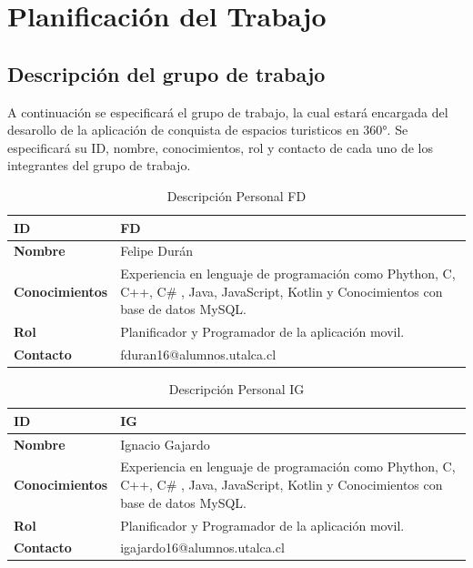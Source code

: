 \section{Planificación del Trabajo}

\subsection{Descripción del grupo de trabajo}
A continuación se especificará el grupo de trabajo, la cual estará encargada del desarollo de la aplicación de conquista de espacios turisticos en 360°. Se especificará su ID, nombre, conocimientos, rol y contacto de cada uno de los integrantes del grupo de trabajo.

\begin{table}[H]
    \centering
        \begin{tabular}{|l | p{12cm} |}        
        \hline
        \textbf{ID} & FD \\
        \hline
        \textbf{Nombre} & Felipe Durán \\
        \hline
        \textbf{Conocimientos} & Experiencia en lenguaje de programación como Phython, C, C++, C\# , Java, JavaScript, Kotlin y Conocimientos con base de datos MySQL. \\
        \hline
        \textbf{Rol} & Planificador y Programador de la aplicación movil. \\    
        \hline
        \textbf{Contacto} & fduran16@alumnos.utalca.cl \\
        \hline            
        \end{tabular}
    \caption{Descripción Personal FD}
\end{table}


\begin{table}[H]
    \centering
        \begin{tabular}{|l | p{12cm} |}        
        \hline
        \textbf{ID} & IG \\
        \hline
        \textbf{Nombre} & Ignacio Gajardo \\
        \hline
        \textbf{Conocimientos} & Experiencia en lenguaje de programación como Phython, C, C++, C\# , Java, JavaScript, Kotlin y Conocimientos con base de datos MySQL. \\
        \hline
        \textbf{Rol} & Planificador y Programador de la aplicación movil. \\    
        \hline
        \textbf{Contacto} & igajardo16@alumnos.utalca.cl \\
        \hline            
        \end{tabular}
    \caption{Descripción Personal IG}
\end{table}


